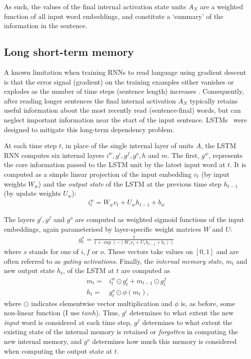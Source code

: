 As such, the values of the final internal activation state units \(A_N\) are a
weighted function of all input word embeddings, and constitute a `summary' of
the information in the sentence.

\subsection{Long short-term memory}

A known limitation when training RNNs to read language using gradient descent is that the error signal (gradient) on the training examples either vanishes or explodes as the number of time steps (sentence length) increases \citep{bengio1994learning}. Consequently, after reading longer sentences the final internal activation \(A_N\) typically retains useful information about the most recently read (sentence-final) words, but can neglect important information near the start of the input sentence. LSTMs~\citep{hochreiter1997long} were designed to mitigate this long-term dependency problem. 

At each time step \(t\), in place of the single internal layer of units \(A\),
the LSTM RNN computes six internal layers \(i^w , g^i, g^f , g^o, h\) and
\(m\). The first, \(g^w\), represents the core information passed to the LSTM
unit by the latest input word at \(t\). It is computed as a simple linear
projection of the input embedding \(v_t\) (by input weights \(W_w\)) and the
\emph{output state} of the LSTM at the previous time step \(h_{t-1}\) (by
update weights \(U_w\)):
\begin{align*}
i_t^w = W_w v_t + U_wh_{t-1} +  b_w
\end{align*}

The layers \(g^i, g^f \) and \(g^o \) are computed as weighted sigmoid
functions of the input embeddings, again parameterised by layer-specific weight
matrices \(W\) and \(U\):
\begin{align*}
g_t^s = \frac{1}{1+\exp(-(W_s v_t + U_sh_{t-1} + b_s  ))}
\end{align*}
where \(s\) stands for one of \(i,f\) or \(o\). These vectors take
values on \([0,1]\) and are often referred to as \emph{gating activations}.
Finally, the \emph{internal memory state}, \(m_t\) and new output state
\(h_t\), of the LSTM at \(t\) are computed as
\begin{align*}
    m_t =& i_t^w \odot g_t^i + m_{t-1} \odot g_t^f \\
    h_t =& g_t^o \odot \phi(m_t), 
\end{align*}
where \(\odot\) indicates elementwise vector multiplication and \(\phi\) is, as
before, some non-linear function (I use \(tanh\)). Thus, \(g^i\) determines to
what extent the new \emph{input} word is considered at each time step, \(g^f\)
determines to what extent the existing state of the internal memory is retained
or \emph{forgotten} in computing the new internal memory, and \(g^o\)
determines how much this memory is considered when computing the output state
at \(t\). 

